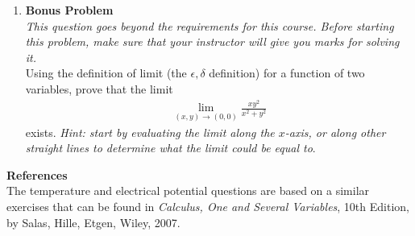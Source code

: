 \documentclass{article}
\begin{document}
\begin{enumerate}
\item 
\textbf{Bonus Problem}\\
\textit{This question goes beyond the requirements for this course. Before starting this problem, make sure that your instructor will give you marks for solving it.} \\
Using the definition of limit (the $\epsilon, \delta$ definition) for a function of two variables, prove that the limit
\begin{align*}
\lim_{(x,y)\rightarrow(0,0) } \frac{xy^2}{x^2+y^2}
\end{align*}
exists. \textit{Hint: start by evaluating the limit along the $x$-axis, or along other straight lines to determine what the limit could be equal to}.
\end{enumerate}
\noindent \textbf{References} \\
The temperature and electrical potential questions are based on a similar exercises that can be found in \textit{Calculus, One and Several Variables}, 10th Edition, by Salas, Hille, Etgen, Wiley, 2007.

\newpage
\end{document}
